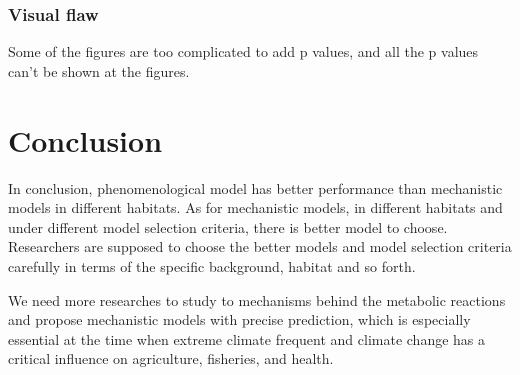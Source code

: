 \documentclass[11pt]{article}
\begin{document}
		\subsubsection{Visual flaw}
		Some of the figures are too complicated to add p values, and all the p values can't be shown at the figures.
		
		\section{Conclusion}
		In conclusion, phenomenological model has better performance than mechanistic models in different habitats. As for mechanistic models, in different habitats and under different model selection criteria, there is better model to choose. Researchers are supposed to choose the better models and model selection criteria carefully in terms of the specific background, habitat and so forth.
		
		We need more researches to study to mechanisms behind the metabolic reactions and propose mechanistic models with precise prediction, which is especially essential at the time when extreme climate frequent and climate change has a critical influence on agriculture, fisheries, and health.
	

	
	 




	
		
	

	
	
	
	\newpage
	
	
\end{document}
